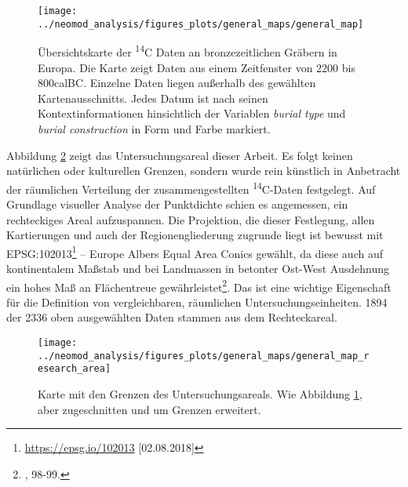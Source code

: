 \documentclass[openany,twoside,twocolumn]{book}
\let\rmarkdownfootnote\footnote%
\def\footnote{\protect\rmarkdownfootnote}
\begin{document}
\begin{figure}
\texttt{[image: ../neomod\_analysis/figures\_plots/general\_maps/general\_map]} \caption[Übersichtskarte der \textsuperscript{14}C Daten an bronzezeitlichen Gräbern in Europa]{Übersichtskarte der \textsuperscript{14}C Daten an bronzezeitlichen Gräbern in Europa. Die Karte zeigt Daten aus einem  Zeitfenster von 2200 bis 800calBC. Einzelne Daten liegen außerhalb des gewählten Kartenausschnitts. Jedes Datum ist nach seinen Kontextinformationen hinsichtlich der Variablen \textit{burial type} und \textit{burial construction} in Form und Farbe markiert.}\label{fig:general-map}
\end{figure}

Abbildung \ref{fig:general-map-research-area} zeigt das
Untersuchungsareal dieser Arbeit. Es folgt keinen natürlichen oder
kulturellen Grenzen, sondern wurde rein künstlich in Anbetracht der
räumlichen Verteilung der zusammengestellten \textsuperscript{14}C-Daten
festgelegt. Auf Grundlage visueller Analyse der Punktdichte schien es
angemessen, ein rechteckiges Areal aufzuspannen. Die Projektion, die
dieser Festlegung, allen Kartierungen und auch der Regionengliederung
zugrunde liegt ist bewusst mit EPSG:102013\footnote{\url{https://epsg.io/102013}
  {[}02.08.2018{]}} -- Europe Albers Equal Area Conics gewählt, da diese
auch auf kontinentalem Maßstab und bei Landmassen in betonter Ost-West
Ausdehnung ein hohes Maß an Flächentreue gewährleistet\footnote{\textcite{snyder_map_1987},
  98-99.}. Das ist eine wichtige Eigenschaft für die Definition von
vergleichbaren, räumlichen Untersuchungseinheiten. 1894 der 2336 oben
ausgewählten Daten stammen aus dem Rechteckareal.

\begin{figure}
\texttt{[image: ../neomod\_analysis/figures\_plots/general\_maps/general\_map\_research\_area]} \caption[Karte mit den Grenzen des Untersuchungsareals]{Karte mit den Grenzen des Untersuchungsareals. Wie Abbildung \ref{fig:general-map}, aber zugeschnitten und um Grenzen erweitert.}\label{fig:general-map-research-area}
\end{figure}
\end{document}

